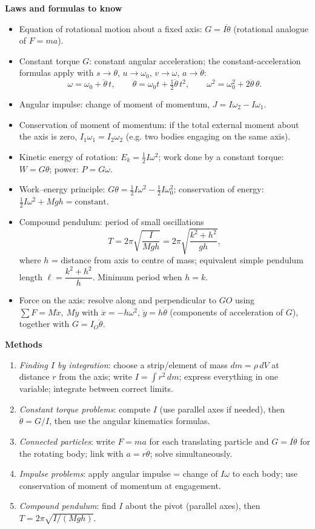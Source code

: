 \documentclass[11pt]{article}
\newcommand{\cle}[1]{{\popxbold\color{popdark}#1}}
\begin{document}
\begin{bilan}
\textbf{Laws and formulas to know}
\begin{itemize}
\item Equation of rotational motion about a fixed axis: $\boxed{G=I\ddot{\theta}}$ (rotational analogue of $F=ma$).
\item Constant torque $G$: constant angular acceleration; the constant-acceleration formulas apply with $s\to\theta$, $u\to\omega_0$, $v\to\omega$, $a\to\ddot\theta$:
\[ \omega=\omega_0+\ddot\theta\,t,\qquad \theta=\omega_0 t+\tfrac12\ddot\theta\,t^{2},\qquad \omega^{2}=\omega_0^{2}+2\ddot\theta\,\theta. \]
\item Angular impulse: change of moment of momentum, $J=I\omega_2-I\omega_1$.
\item \cle{Conservation of moment of momentum}: if the total external moment about the axis is zero, $I_1\omega_1=I_2\omega_2$ (e.g. two bodies engaging on the same axis).
\item Kinetic energy of rotation: $E_k=\tfrac12 I\omega^{2}$; work done by a constant torque: $W=G\theta$; power: $P=G\omega$.
\item Work–energy principle: $G\theta=\tfrac12 I\omega^{2}-\tfrac12 I\omega_0^{2}$; conservation of energy: $\tfrac12 I\omega^{2}+Mgh=\text{constant}$.
\item Compound pendulum: period of small oscillations
\[ T=2\pi\sqrt{\frac{I}{Mgh}}=2\pi\sqrt{\frac{k^{2}+h^{2}}{gh}}, \]
where $h$ = distance from axis to centre of mass; equivalent simple pendulum length $\ell=\dfrac{k^{2}+h^{2}}{h}$. Minimum period when $h=k$.
\item Force on the axis: resolve along and perpendicular to $GO$ using $\sum F=M\ddot x,\ M\ddot y$ with $\ddot x=-h\omega^{2}$, $\ddot y=h\ddot\theta$ (components of acceleration of $G$), together with $G=I_O\ddot\theta$.
\end{itemize}

\textbf{Methods}
\begin{enumerate}
\item \emph{Finding $I$ by integration}: choose a strip/element of mass $dm=\rho\,dV$ at distance $r$ from the axis; write $I=\int r^{2}\,dm$; express everything in one variable; integrate between correct limits.
\item \emph{Constant torque problems}: compute $I$ (use parallel axes if needed), then $\ddot\theta=G/I$, then use the angular kinematics formulas.
\item \emph{Connected particles}: write $F=ma$ for each translating particle and $G=I\ddot\theta$ for the rotating body; link with $a=r\ddot\theta$; solve simultaneously.
\item \emph{Impulse problems}: apply angular impulse = change of $I\omega$ to each body; use conservation of moment of momentum at engagement.
\item \emph{Compound pendulum}: find $I$ about the pivot (parallel axes), then $T=2\pi\sqrt{I/(Mgh)}$.
\end{enumerate}


\end{bilan}
\end{document}
